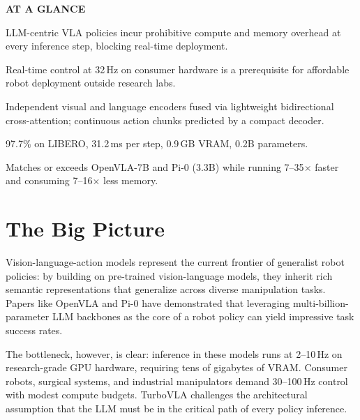 \documentclass[10pt,twocolumn]{article}
\begin{document}
\begin{mdframed}[backgroundcolor=boxgray,linecolor=rulered,linewidth=1pt,
    innerleftmargin=6pt,innerrightmargin=6pt,
    innertopmargin=6pt,innerbottommargin=6pt]
\textbf{\small AT A GLANCE}\par\vspace{4pt}
\begin{description}[leftmargin=0pt,labelsep=4pt,itemsep=2pt,parsep=0pt,
    font=\small\bfseries]
  \item[Problem:] LLM-centric VLA policies incur prohibitive compute and
    memory overhead at every inference step, blocking real-time deployment.
  \item[Why it matters:] Real-time control at 32\,Hz on consumer hardware
    is a prerequisite for affordable robot deployment outside research labs.
  \item[Method:] Independent visual and language encoders fused via
    lightweight bidirectional cross-attention; continuous action chunks
    predicted by a compact decoder.
  \item[Result:] 97.7\% on LIBERO, 31.2\,ms per step, 0.9\,GB VRAM,
    0.2B parameters.
  \item[Evidence:] Matches or exceeds OpenVLA-7B and Pi-0 (3.3B) while
    running 7--35$\times$ faster and consuming 7--16$\times$ less memory.
\end{description}
\end{mdframed}

\section{The Big Picture}

Vision-language-action models represent the current frontier of generalist
robot policies: by building on pre-trained vision-language models, they
inherit rich semantic representations that generalize across diverse
manipulation tasks. Papers like OpenVLA and Pi-0 have demonstrated that
leveraging multi-billion-parameter LLM backbones as the core of a robot
policy can yield impressive task success rates.

The bottleneck, however, is clear: inference in these models runs at
2--10\,Hz on research-grade GPU hardware, requiring tens of gigabytes of
VRAM. Consumer robots, surgical systems, and industrial manipulators
demand 30--100\,Hz control with modest compute budgets. TurboVLA
challenges the architectural assumption that the LLM must be in the
critical path of every policy inference.
\end{document}
